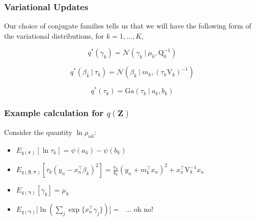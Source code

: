 \documentclass{beamer}
\newcommand{\tr}{\intercal}
\newcommand\given[1][]{\:#1\vert\:}
\begin{document}
\begin{frame}
\frametitle{Variational Updates}

Our choice of conjugate families tells us that we will have the following form of the variational distributions, for $k = 1, \ldots, K$,

\begin{equation} \label{q_gamma}
	q^{*}(\gamma_k) = \mathcal{N} \left(\gamma_k \given \mu_k, \mathrm{Q}_k^{-1} \right)
\end{equation}

\begin{equation} \label{q_beta}
	q^{*}(\beta_k \given \tau_k) = \mathcal{N}\left(\beta_k \given m_k, (\tau_k \mathrm{V}_k)^{-1} \right)
\end{equation}

\begin{equation} \label{eq:q_tau}
	q^{*}(\tau_k) =  \mathrm{Ga}\left( \tau_k \given a_k, b_k \right)
\end{equation}
\end{frame}

\begin{frame}
\frametitle{Example calculation for $q(\mathbf{Z})$}

Consider the quantity $\ln \rho_{nk}$:

\begin{itemize}
	\item $E_{q(\boldsymbol\tau)}[ \ln \tau_k ] = \psi(a_k) - \psi(b_k)$ 
\end{itemize}

\begin{itemize}
	\item $E_{q(\boldsymbol\beta, \boldsymbol\tau)}[\tau_k (y_n - x_n^{\tr}\beta_k)^2] = \frac{a_k}{b_k}(y_n + m_k^{\tr}x_n)^2 + x_n^{\tr} \mathrm{V}_k^{-1} x_n $
\end{itemize}

\begin{itemize}
	\item $E_{q(\boldsymbol\gamma)}[\gamma_k] = \mu_k$
\end{itemize}

\begin{itemize}
	\item $E_{q(\boldsymbol\gamma)}\Bigg[\ln \left( \sum_{j} \exp \{ x_n^{\tr} \gamma_j \}\right)\Bigg] =  \textrm{ } \ldots \textrm{ oh no!}$
\end{itemize}


\end{frame}
\end{document}
